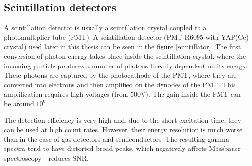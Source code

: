 \subsection{Scintillation detectors}
A scintillation detector is usually a scintillation crystal coupled to a photomultiplier tube (PMT). A scintillation detector (PMT R6095 with YAP(Ce) crystal) used later in this thesis can be seen in the figure \ref{scintillator}. The first conversion of photon energy takes place inside the scintillation crystal, where the incoming particle produces a number of photons linearly dependent on its energy. These photons are captured by the photocathode of the PMT, where they are converted into electrons and then amplified on the dynodes of the PMT. This amplification requires high voltages (from $500$V). The gain inside the PMT can be around $10^6$.
\par
The detection efficiency is very high and, due to the short excitation time, they can be used at high count rates. However, their energy resolution is much worse than in the case of gas detectors and semiconductors. The resulting gamma spectra tend to have distorted broad peaks, which negatively affects Mössbauer spectroscopy - reduces SNR. 



